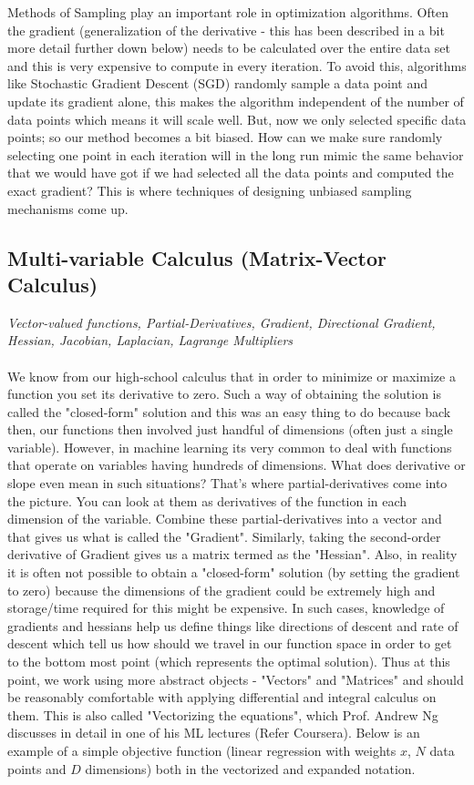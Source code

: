 \documentclass[a4paper]{article}
\begin{document}
\noindent Methods of Sampling play an important role in optimization algorithms. Often the gradient (generalization of the derivative - this has been described in a bit more detail further down below) needs to be calculated over the entire data set and this is very expensive to compute in every iteration. To avoid this, algorithms like Stochastic Gradient Descent (SGD) randomly sample a data point and update its gradient alone, this makes the algorithm independent of the number of data points which means it will scale well. But, now we only selected specific data points; so our method becomes a bit biased. How can we make sure randomly selecting one point in each iteration will in the long run mimic the same behavior that we would have got if we had selected all the data points and computed the exact gradient? This is where techniques of designing unbiased sampling mechanisms come up. \\

\subsection{Multi-variable Calculus (Matrix-Vector Calculus)}
\textit{Vector-valued functions, Partial-Derivatives, Gradient, Directional Gradient, Hessian, Jacobian, Laplacian, Lagrange Multipliers} \\ \\
We know from our high-school calculus that in order to minimize or maximize a function you set its derivative to zero. Such a way of obtaining the solution is called the "closed-form" solution and this was an easy thing to do because back then, our functions then involved just handful of dimensions (often just a single variable). However, in machine learning its very common to deal with functions that operate on variables having hundreds of dimensions. What does derivative or slope even mean in such situations? That's where partial-derivatives come into the picture. You can look at them as derivatives of the function in each dimension of the variable. Combine these partial-derivatives into a vector and that gives us what is called the "Gradient". Similarly, taking the second-order derivative of Gradient gives us a matrix termed as the "Hessian". Also, in reality it is often not possible to obtain a "closed-form" solution (by setting the gradient to zero) because the dimensions of the gradient could be extremely high and storage/time required for this might be expensive. In such cases, knowledge of gradients and hessians help us define things like directions of descent and rate of descent which tell us how should we travel in our function space in order to get to the bottom most point (which represents the optimal solution). Thus at this point, we work using more abstract objects - "Vectors" and "Matrices" and should be reasonably comfortable with applying differential and integral calculus on them. This is also called "Vectorizing the equations", which Prof. Andrew Ng discusses in detail in one of his ML lectures (Refer Coursera). Below is an example of a simple objective function (linear regression with weights $x$, $N$ data points and $D$ dimensions) both in the vectorized and expanded notation. \\
\end{document}

